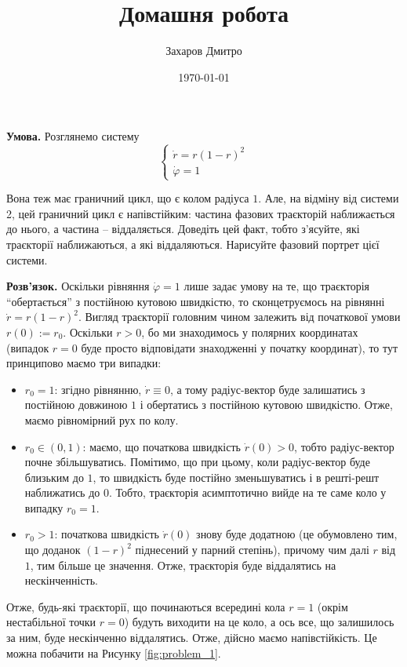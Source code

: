 \documentclass[oneside,solution]{tmpl}
\title{Домашня робота}
\author{Захаров Дмитро}
\date{\today}
\begin{document}
\maketitle



\textbf{Умова.} Розглянемо систему
\begin{equation}
    \begin{cases}
        \dot{r} = r(1-r)^2 \\
        \dot{\varphi} = 1
    \end{cases}
\end{equation}

Вона теж має граничний цикл, що є колом радіуса $1$. Але, на відміну від системи 2, цей граничний цикл є напівстійким: частина фазових траєкторій наближається до нього, а частина -- віддаляється. Доведіть цей факт, тобто з'ясуйте, які траєкторії наближаються, а які віддаляються. Нарисуйте фазовий портрет цієї системи.

\textbf{Розв'язок.} Оскільки рівняння $\dot{\varphi}=1$ лише задає умову на те, що траєкторія ``обертається'' з постійною кутовою швидкістю, то сконцетруємось на рівнянні $\dot{r} = r(1-r)^2$. Вигляд траєкторії головним чином залежить від початкової умови $r(0) := r_0$. Оскільки $r>0$, бо ми знаходимось у полярних координатах (випадок $r=0$ буде просто відповідати знаходженні у початку координат), то тут принципово маємо три випадки:
\begin{itemize}
    \item $r_0=1$: згідно рівнянню, $\dot{r} \equiv 0$, а тому радіус-вектор буде залишатись з постійною довжиною $1$ і обертатись з постійною кутовою швидкістю. Отже, маємо рівномірний рух по колу.
    \item $r_0 \in (0,1)$: маємо, що початкова швидкість $\dot{r}(0) > 0$, тобто радіус-вектор почне збільшуватись. Помітимо, що при цьому, коли радіус-вектор буде близьким до $1$, то швидкість буде постійно зменьшуватись і в решті-решт наближатись до $0$. Тобто, траєкторія асимптотично вийде на те саме коло у випадку $r_0=1$.
    \item $r_0>1$: початкова швидкість $\dot{r}(0)$ знову буде додатною (це обумовлено тим, що доданок $(1-r)^2$ піднесений у парний степінь), причому чим далі $r$ від $1$, тим більше це значення. Отже, траєкторія буде віддалятись на нескінченність.
\end{itemize}

Отже, будь-які траєкторії, що починаються всередині кола $r=1$ (окрім нестабільної точки $r=0$) будуть виходити на це коло, а ось все, що залишилось за ним, буде нескінченно віддалятись. Отже, дійсно маємо напівстійкість. Це можна побачити на Рисунку \ref{fig:problem_1}.
\end{document}
